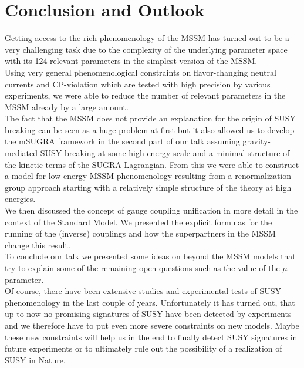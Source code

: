\section{Conclusion and Outlook}
Getting access to the rich phenomenology of the MSSM has turned out to be a very challenging task due to the complexity of the underlying parameter space with its 124 relevant parameters in the simplest version of the MSSM. \\
Using very general phenomenological constraints on flavor-changing neutral currents and CP-violation which are tested with high precision by various experiments, we were able to reduce the number of relevant parameters in the MSSM already by a large amount. \\ 
The fact that the MSSM does not provide an explanation for the origin of SUSY breaking can be seen as a huge problem at first but it also allowed us to develop the mSUGRA framework in the second part of our talk assuming gravity-mediated SUSY breaking at some high energy scale and a minimal structure of the kinetic terms of the SUGRA Lagrangian. From this we were able to construct a model for low-energy MSSM phenomenology resulting from a renormalization group approach starting with a relatively simple structure of the theory at high energies. \\
We then discussed the concept of gauge coupling unification in more detail in the context of the Standard Model. We presented the explicit formulas for the running of the (inverse) couplings and how the superpartners in the MSSM change this result. \\
To conclude our talk we presented some ideas on beyond the MSSM models that try to explain some of the remaining open questions such as the value of the $\mu$ parameter. \\
Of course, there have been extensive studies and experimental tests of SUSY phenomenology in the last couple of  years. Unfortunately it has turned out, that up to now no promising signatures of SUSY have been detected by experiments and we therefore have to put even more severe constraints on new models. Maybe these new constraints will help us in the end to finally detect SUSY signatures in future experiments or to ultimately rule out the possibility of a realization of SUSY in Nature. 